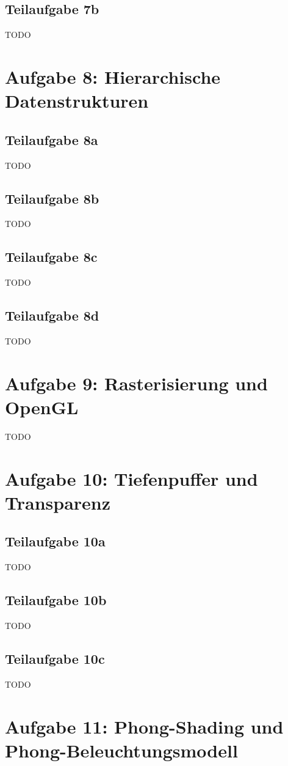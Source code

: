 \documentclass[a4paper]{scrartcl}
\begin{document}
\subsection*{Teilaufgabe 7b}
TODO

\section*{Aufgabe 8: Hierarchische Datenstrukturen}
\subsection*{Teilaufgabe 8a}
TODO
\subsection*{Teilaufgabe 8b}
TODO
\subsection*{Teilaufgabe 8c}
TODO
\subsection*{Teilaufgabe 8d}
TODO

\section*{Aufgabe 9: Rasterisierung und OpenGL}
TODO

\section*{Aufgabe 10: Tiefenpuffer und Transparenz}
\subsection*{Teilaufgabe 10a}
TODO
\subsection*{Teilaufgabe 10b}
TODO
\subsection*{Teilaufgabe 10c}
TODO

\section*{Aufgabe 11: Phong-Shading und Phong-Beleuchtungsmodell}
\inputminted[linenos, numbersep=5pt, tabsize=4, frame=lines, label=shader.vert]{glsl}{shader.vert}
\end{document}
